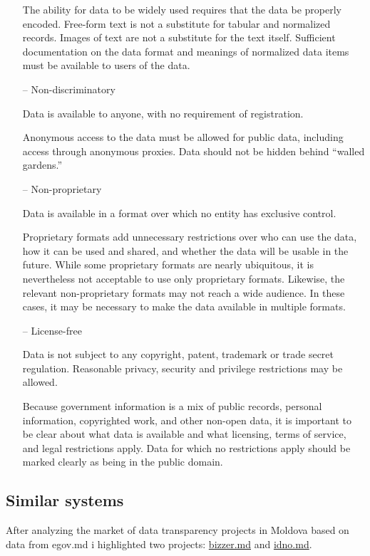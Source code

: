 \documentclass[12pt,a4paper,titlepage]{article}
\begin{document}
\begin{itemize}
The ability for data to be widely used requires that the data be properly encoded. Free-form text is not a substitute for tabular and normalized records. Images of text are not a substitute for the text itself. Sufficient documentation on the data format and meanings of normalized data items must be available to users of the data.

\item[--] Non-discriminatory

Data is available to anyone, with no requirement of registration.

Anonymous access to the data must be allowed for public data, including access through anonymous proxies. Data should not be hidden behind “walled gardens.”

\item[--] Non-proprietary

Data is available in a format over which no entity has exclusive control.

Proprietary formats add unnecessary restrictions over who can use the data, how it can be used and shared, and whether the data will be usable in the future. While some proprietary formats are nearly ubiquitous, it is nevertheless not acceptable to use only proprietary formats. Likewise, the relevant non-proprietary formats may not reach a wide audience. In these cases, it may be necessary to make the data available in multiple formats.

\item[--] License-free

Data is not subject to any copyright, patent, trademark or trade secret regulation. Reasonable privacy, security and privilege restrictions may be allowed.

Because government information is a mix of public records, personal information, copyrighted work, and other non-open data, it is important to be clear about what data is available and what licensing, terms of service, and legal restrictions apply. Data for which no restrictions apply should be marked clearly as being in the public domain.
\end{itemize}

\subsection{Similar systems}
After analyzing the market of data transparency projects in Moldova based on data from egov.md i highlighted two projects: \underline{bizzer.md} and \underline{idno.md}.\\
\end{document}
